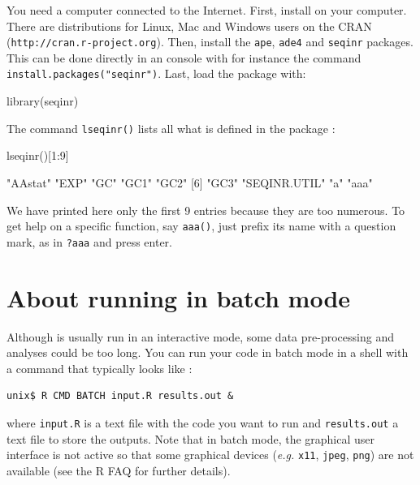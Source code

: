 \documentclass{article}
\begin{document}
You need a computer connected to the Internet. First, install \Rlogo{} on your computer.
There are distributions for Linux, Mac and Windows users
on the CRAN (\texttt{http://cran.r-project.org}). Then, install the \texttt{ape}, 
\texttt{ade4} and \texttt{seqinr} packages. This can be done directly in an \Rlogo{} console
with for instance the command \texttt{install.packages("seqinr")}. 
Last, load the \seqinr{} package with:

\begin{Schunk}
\begin{Sinput}
library(seqinr)
\end{Sinput}
\end{Schunk}

The command \texttt{lseqinr()} lists all what is defined in the package \seqinr{}:

\begin{Schunk}
\begin{Sinput}
 lseqinr()[1:9]
\end{Sinput}
\begin{Soutput}
[1] "AAstat"      "EXP"         "GC"          "GC1"         "GC2"        
[6] "GC3"         "SEQINR.UTIL" "a"           "aaa"        
\end{Soutput}
\end{Schunk}

We have printed here only the first 9 entries because they are too numerous.
To get help on a specific function, say \texttt{aaa()}, just prefix its name
with a question mark, as in \texttt{?aaa} and press enter.

\section{About running \Rlogo{} in batch mode}

Although \Rlogo{} is usually run in an interactive mode, some data pre-processing 
and analyses could be too long. You can run your \Rlogo{} code in batch mode
in a shell with a command that typically looks like :

\begin{verbatim}
unix$ R CMD BATCH input.R results.out &
\end{verbatim}

where \texttt{input.R} is a text file with the \Rlogo{} code you want to run and
\texttt{results.out} a text file to store the outputs. Note that in batch mode,
the graphical user interface is not active so that some graphical devices 
(\textit{e.g.} \texttt{x11}, \texttt{jpeg}, \texttt{png}) are not
available (see the R FAQ \cite{RFAQ} for further details).
\end{document}
